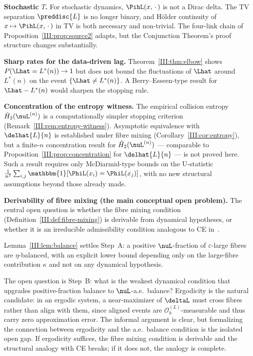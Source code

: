 \textbf{Stochastic $T$.}
For stochastic dynamics, $\PihL(x,\,\cdot\,)$ is not a Dirac delta.
The TV separation $\preddisc{L}$ is no longer binary, and Hölder continuity
of $x \mapsto \PihL(x,\,\cdot\,)$ in TV is both necessary and non-trivial.
The four-link chain of Proposition~\ref{III:prop:source2} adapts, but the
Conjunction Theorem's proof structure changes substantially.

\textbf{Sharp rates for the data-driven lag.}
Theorem~\ref{III:thm:elbow} shows $P(\Lhat = L^*(n)) \to 1$ but does not bound
the fluctuations of $\Lhat$ around $L^*(n)$ on the event $\{\Lhat \neq L^*(n)\}$.
A Berry--Esseen-type result for $\Lhat - L^*(n)$ would sharpen the stopping rule.

\textbf{Concentration of the entropy witness.}
The empirical collision entropy $\hat{H}_2(\nuL^{(n)})$ is a computationally
simpler stopping criterion (Remark~\ref{III:rem:entropy-witness}).
Asymptotic equivalence with $\delhat{L}{n}$ is established under fibre mixing
(Corollary~\ref{III:cor:entropy}), but a finite-$n$ concentration result for
$\hat{H}_2(\nuL^{(n)})$ --- comparable to Proposition~\ref{III:prop:concentration}
for $\delhat{L}{n}$ --- is not proved here.
Such a result requires only McDiarmid-type bounds on the U-statistic
$\frac{1}{n^2}\sum_{i,j} \mathbbm{1}[\PhiL(x_i) = \PhiL(x_j)]$, with no
new structural assumptions beyond those already made.

\textbf{Derivability of fibre mixing (the main conceptual open problem).}
The central open question is whether the fibre mixing condition
(Definition~\ref{III:def:fibre-mixing}) is derivable from dynamical hypotheses, or
whether it is an irreducible admissibility condition analogous to CE in~\cite{mahon_paper1}.

Lemma~\ref{III:lem:balance} settles Step~A: a positive $\nuL$-fraction of
$\varepsilon$-large fibres are $\eta$-balanced, with an explicit lower bound
depending only on the large-fibre contribution $\kappa$ and not on any dynamical
hypothesis.

The open question is Step~B: what is the weakest dynamical condition that
upgrades positive-fraction balance to $\nuL$-a.e.\ balance?  Ergodicity is the
natural candidate: in an ergodic system, a near-maximizer of $\deltaL$ must
cross fibres rather than align with them, since aligned events are
$\mathcal{O}_h^{(L)}$-measurable and thus carry zero approximation error.  The
informal argument is clear, but formalizing the connection between ergodicity
and the a.e.\ balance condition is the isolated open gap.  If ergodicity
suffices, the fibre mixing condition is derivable and the structural analogy
with CE breaks; if it does not, the analogy is complete.

\ifstandalone


\fi
